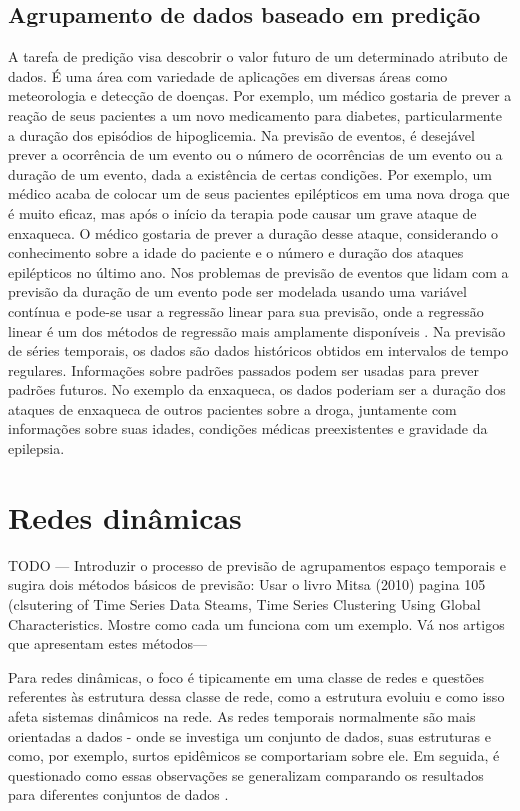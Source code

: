\subsection{Agrupamento de dados baseado em predição}
A tarefa de predição visa descobrir o valor futuro de um determinado atributo de dados. É uma área com variedade de aplicações em diversas áreas como meteorologia e detecção de doenças. Por exemplo, um médico gostaria de prever a reação de seus pacientes a um novo medicamento para diabetes, particularmente a duração dos episódios de hipoglicemia.
Na previsão de eventos, é desejável prever a ocorrência de um evento ou o número de ocorrências de um evento ou a duração de um evento, dada a existência de certas condições. Por exemplo, um médico acaba de colocar um de seus pacientes epilépticos em uma nova droga que é muito eficaz, mas após o início da terapia pode causar um grave ataque de enxaqueca. O médico gostaria de prever a duração desse ataque, considerando o conhecimento sobre a idade do paciente e o número e duração dos ataques epilépticos no último ano. Nos problemas de previsão de eventos que lidam com a previsão da duração de um evento pode ser modelada usando uma variável contínua e pode-se usar a regressão linear para sua previsão, onde a regressão linear é um dos métodos de regressão mais amplamente disponíveis \cite{Mitsa:2010}.
Na previsão de séries temporais, os dados são dados históricos obtidos em intervalos de tempo regulares. Informações sobre padrões passados podem ser usadas para prever padrões futuros. No exemplo da enxaqueca, os dados poderiam ser a duração dos ataques de enxaqueca de outros pacientes sobre a droga, juntamente com informações sobre suas idades, condições médicas preexistentes e gravidade da epilepsia.

\section{Redes dinâmicas}
 \label{redes-dinamicas}
 
 TODO --- Introduzir o processo de previsão de agrupamentos espaço temporais e sugira dois métodos básicos de previsão: Usar o livro Mitsa (2010) pagina 105 (clsutering of Time Series Data Steams, Time Series Clustering Using Global Characteristics. Mostre como cada um funciona com um exemplo. Vá nos artigos que apresentam estes métodos---

 
 Para redes dinâmicas, o foco é tipicamente em uma classe de redes e questões referentes às estrutura dessa classe de rede, como a estrutura evoluiu e como isso afeta sistemas dinâmicos na rede. As redes temporais normalmente são mais orientadas a dados - onde se investiga um conjunto de dados, suas estruturas e como, por exemplo, surtos epidêmicos se comportariam sobre ele. Em seguida, é questionado como essas observações se generalizam comparando os resultados para diferentes conjuntos de dados \cite{holme:colloquium}.
 
